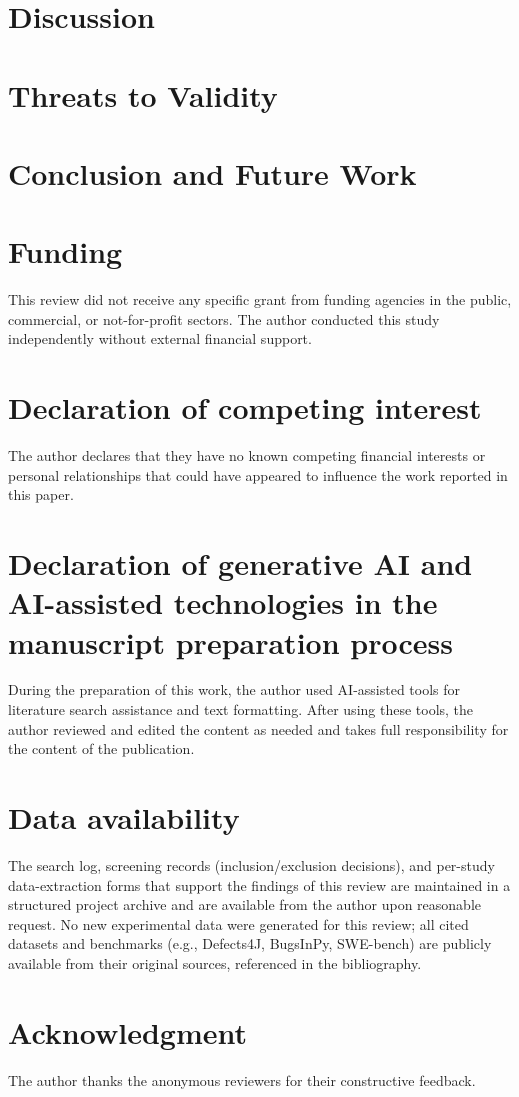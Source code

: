 \documentclass[a4paper,fleqn,review,12pt]{cas-sc}
\begin{document}
\section{Discussion}
\label{sec:discussion}


\section{Threats to Validity}
\label{sec:threats}
\label{sec:validity}


\section{Conclusion and Future Work}
\label{sec:conclusion}


\section*{Funding}
This review did not receive any specific grant from funding agencies in the public, commercial, or not-for-profit sectors. The author conducted this study independently without external financial support.

\section*{Declaration of competing interest}
The author declares that they have no known competing financial interests or personal relationships that could have appeared to influence the work reported in this paper.

\section*{Declaration of generative AI and AI-assisted technologies in the manuscript preparation process}
During the preparation of this work, the author used AI-assisted tools for literature search assistance and text formatting. After using these tools, the author reviewed and edited the content as needed and takes full responsibility for the content of the publication.

\section*{Data availability}
The search log, screening records (inclusion/exclusion decisions), and per-study data-extraction forms that support the findings of this review are maintained in a structured project archive and are available from the author upon reasonable request. No new experimental data were generated for this review; all cited datasets and benchmarks (e.g., Defects4J, BugsInPy, SWE-bench) are publicly available from their original sources, referenced in the bibliography.

\printcredits

\section*{Acknowledgment}
The author thanks the anonymous reviewers for their constructive feedback.



\end{document}
